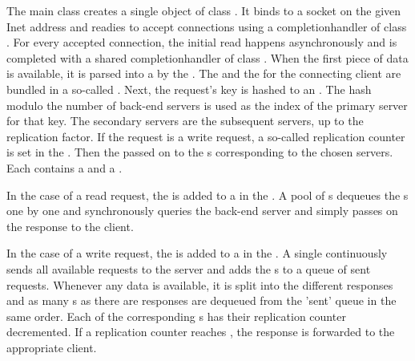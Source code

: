 \documentclass[11pt]{article}
\begin{document}
The main class  creates a single object of class .
It binds to a socket on the given Inet address and readies to accept connections using a completionhandler of class .
For every accepted connection, the initial read happens asynchronously and is completed with a shared completionhandler of class .
When the first piece of data is available, it is parsed into a  by the .
The  and the  for the connecting client are bundled in a so-called .
Next, the request's key is hashed to an .
The hash modulo the number of back-end servers is used as the index of the primary server for that key.
The secondary servers are the subsequent servers, up to the replication factor.
If the request is a write request, a so-called replication counter is set in the .
Then the  passed on to the s corresponding to the chosen servers.
Each  contains a  and a .

In the case of a read request, the  is added to a  in the .
A pool of s dequeues the s one by one and synchronously queries the back-end server and simply passes on the response to the client.

In the case of a write request, the  is added to a  in the .
A single  continuously sends all available requests to the server and adds the s to a queue of sent requests.
Whenever any data is available, it is split into the different responses and as many s as there are responses are dequeued from the 'sent' queue in the same order.
Each of the corresponding s has their replication counter decremented.
If a replication counter reaches , the response is forwarded to the appropriate client.
\end{document}
